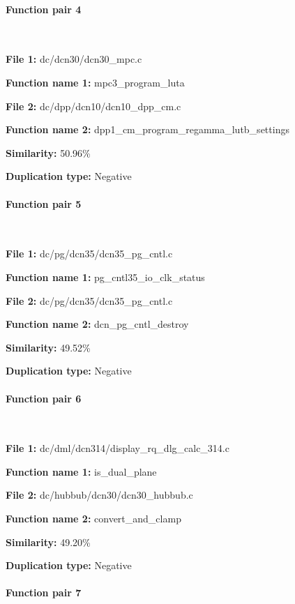\paragraph{Function pair 4 }  

\

\textbf{File 1:} dc/dcn30/dcn30\_mpc.c

\textbf{Function name 1:} mpc3\_program\_luta

\textbf{File 2:} dc/dpp/dcn10/dcn10\_dpp\_cm.c

\textbf{Function name 2:} dpp1\_cm\_program\_regamma\_lutb\_settings

\textbf{Similarity:} 50.96\%

\textbf{Duplication type:} Negative


\paragraph{Function pair 5 }  

\

\textbf{File 1:} dc/pg/dcn35/dcn35\_pg\_cntl.c

\textbf{Function name 1:} pg\_cntl35\_io\_clk\_status

\textbf{File 2:} dc/pg/dcn35/dcn35\_pg\_cntl.c

\textbf{Function name 2:} dcn\_pg\_cntl\_destroy

\textbf{Similarity:} 49.52\%

\textbf{Duplication type:} Negative


\paragraph{Function pair 6 }  

\

\textbf{File 1:} dc/dml/dcn314/display\_rq\_dlg\_calc\_314.c

\textbf{Function name 1:} is\_dual\_plane

\textbf{File 2:} dc/hubbub/dcn30/dcn30\_hubbub.c

\textbf{Function name 2:} convert\_and\_clamp

\textbf{Similarity:} 49.20\%

\textbf{Duplication type:} Negative


\paragraph{Function pair 7 }  

\

